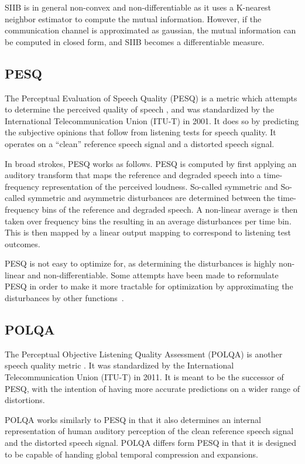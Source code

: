 SIIB is in general non-convex and non-differentiable as it uses a K-nearest neighbor estimator to compute the mutual information.
However, if the communication channel is approximated as gaussian, the mutual information can be computed in closed form, and SIIB becomes a differentiable
measure.

\subsection{PESQ}
The Perceptual Evaluation of Speech Quality (PESQ) is a metric which attempts to determine the 
perceived quality of speech \cite{rix2001perceptual}, and was standardized by the International Telecommunication Union 
(ITU-T) in 2001.
It does so by predicting the subjective opinions that follow from listening tests for speech quality.
It operates on a ``clean'' reference speech signal and a distorted speech signal.

In broad strokes, PESQ works as follows.
PESQ is computed by first applying an auditory transform that maps the reference and degraded speech into a 
time-frequency representation of the perceived loudness.
So-called symmetric and So-called symmetric and asymmetric disturbances are determined 
between the time-frequency bins of the reference and degraded speech. 
A non-linear average is then taken over frequency bins the resulting in an average disturbances per time bin.
This is then mapped by a linear output mapping to correspond to listening test outcomes.

PESQ is not easy to optimize for, as determining the disturbances is highly non-linear and non-differentiable.
Some attempts have been made to reformulate PESQ in order to make it more tractable for optimization 
by approximating the disturbances by other functions~\cite{kim2019end}.

\subsection{POLQA}
The Perceptual Objective Listening Quality Assessment (POLQA) is another speech quality metric 
\cite{beerends2013perceptual}.
It was standardized by the International Telecommunication Union (ITU-T) in 2011.
It is meant to be the successor of PESQ, with the intention of having more accurate predictions on a 
wider range of distortions.

POLQA works similarly to PESQ in that it also determines an internal representation of human auditory perception of the
clean reference speech signal and the distorted speech signal.
POLQA differs form PESQ in that it is designed to be capable of handing global temporal compression and expansions.

